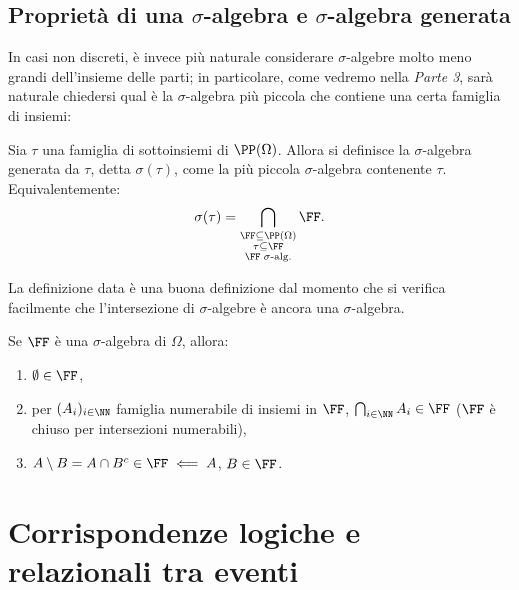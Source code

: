 \begin{multicols*}{2}
    \subsection{Proprietà di una \texorpdfstring{$\sigma$}{σ}-algebra e \texorpdfstring{$\sigma$}{σ}-algebra generata}

    In casi non discreti, è invece più naturale considerare
    $\sigma$-algebre molto meno grandi dell'insieme delle
    parti; in particolare, come vedremo nella \textit{Parte 3},
    sarà naturale chiedersi qual è la $\sigma$-algebra più
    piccola che contiene una certa famiglia di insiemi:

    \begin{definition}
        Sia $\tau$ una famiglia di sottoinsiemi di $\PP(\Omega)$. Allora
        si definisce la $\sigma$-algebra
        generata da $\tau$, detta $\sigma(\tau)$, come la più
        piccola $\sigma$-algebra contenente $\tau$. Equivalentemente:
        \[
            \sigma(\tau) = \bigcap_{\substack{\FF \subseteq \PP(\Omega) \\ \tau \subseteq \FF \\ \FF \; \sigma\text{-alg.}}} \FF.
        \]
    \end{definition}

    \begin{remark}
        La definizione data è una buona definizione dal momento che si
        verifica facilmente che l'intersezione di $\sigma$-algebre è ancora
        una $\sigma$-algebra.
    \end{remark}

    \begin{proposition}[Proprietà di $\FF$] Se $\FF$ è una $\sigma$-algebra
    di $\Omega$, allora:
        \begin{enumerate}[(i.)]
            \item $\emptyset \in \FF$,
            \item per $(A_i)_{i \in \NN}$ famiglia numerabile di insiemi
                in $\FF$, $\bigcap_{i \in \NN} A_i \in \FF$ ($\FF$ è chiuso per intersezioni numerabili),
            \item $A \setminus B = A \cap B^c \in \FF \impliedby A$, $B \in \FF$.
        \end{enumerate}
    \end{proposition}

    \section{Corrispondenze logiche e relazionali tra eventi}


\end{multicols*}
